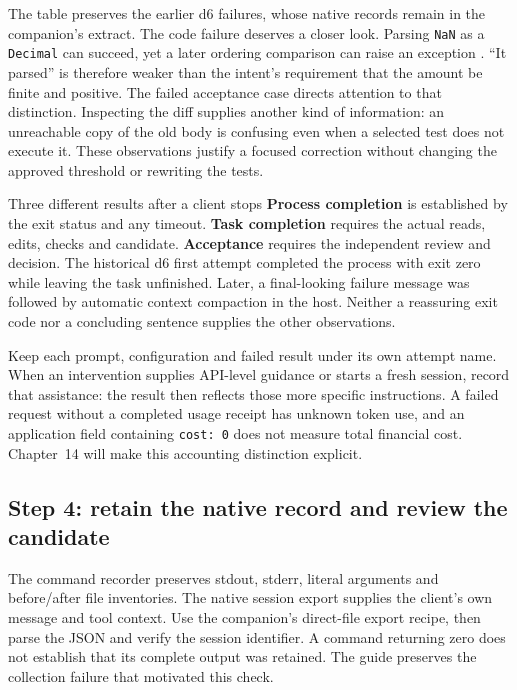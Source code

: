 The table preserves the earlier d6 failures, whose native records remain in the companion's  extract. The code failure deserves a closer look. Parsing \texttt{NaN} as a \texttt{Decimal} can succeed, yet a later ordering comparison can raise an exception \parencite{pythonDecimalCh8}. ``It parsed'' is therefore weaker than the intent's requirement that the amount be finite and positive. The failed acceptance case directs attention to that distinction. Inspecting the diff supplies another kind of information: an unreachable copy of the old body is confusing even when a selected test does not execute it. These observations justify a focused correction without changing the approved threshold or rewriting the tests.

\begin{examplebox}{Three different results after a client stops}
\textbf{Process completion} is established by the exit status and any timeout. \textbf{Task completion} requires the actual reads, edits, checks and candidate. \textbf{Acceptance} requires the independent review and decision. The historical d6 first attempt completed the process with exit zero while leaving the task unfinished. Later, a final-looking failure message was followed by automatic context compaction in the host. Neither a reassuring exit code nor a concluding sentence supplies the other observations.
\end{examplebox}

Keep each prompt, configuration and failed result under its own attempt name. When an intervention supplies API-level guidance or starts a fresh session, record that assistance: the result then reflects those more specific instructions. A failed request without a completed usage receipt has unknown token use, and an application field containing \texttt{cost: 0} does not measure total financial cost. Chapter~14 will make this accounting distinction explicit.

\subsection*{Step 4: retain the native record and review the candidate}

The command recorder preserves stdout, stderr, literal arguments and before/after file inventories. The native session export supplies the client's own message and tool context. Use the companion's direct-file export recipe, then parse the JSON and verify the session identifier. A command returning zero does not establish that its complete output was retained. The guide preserves the collection failure that motivated this check.

